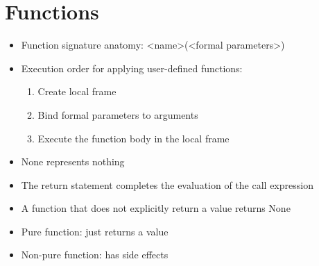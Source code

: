 \section{Functions}
\begin{itemize}
	\item Function signature anatomy: <name>(<formal parameters>)
	\item Execution order for applying user-defined functions:
	\begin{enumerate}
		\item Create local frame
		\item Bind formal parameters to arguments
		\item Execute the function body in the local frame
	\end{enumerate}
	\item None represents nothing
	\item The return statement completes the evaluation of the call expression
    \item A function that does not explicitly return a value returns None
    \item Pure function: just returns a value
    \item Non-pure function: has side effects
\end{itemize}

